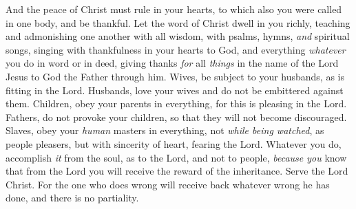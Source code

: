 \begin{biblechapter}
\verse And the peace of Christ must rule in your hearts, to which also you were called in one body, and be thankful.
\verse Let the word of Christ dwell in you richly, teaching and admonishing one another with all wisdom, with psalms, hymns, \textit{and} spiritual songs, singing with thankfulness in your hearts to God,
\verse and everything \textit{whatever} you do in word or in deed, giving thanks \textit{for} all \textit{things} in the name of the Lord Jesus to God the Father through him.
 Wives, be subject to your husbands, as is fitting in the Lord.
\verse Husbands, love your wives and do not be embittered against them.
\verse Children, obey your parents in everything, for this is pleasing in the Lord.
\verse Fathers, do not provoke your children, so that they will not become discouraged.
\verse Slaves, obey your \textit{human} masters in everything, not \textit{while being watched}, as people pleasers, but with sincerity of heart, fearing the Lord.
\verse Whatever you do, accomplish \textit{it} from the soul, as to the Lord, and not to people,
\verse \textit{because you} know that from the Lord you will receive the reward of the inheritance. Serve the Lord Christ.
\verse For the one who does wrong will receive back whatever wrong he has done, and there is no partiality.
\end{biblechapter}

